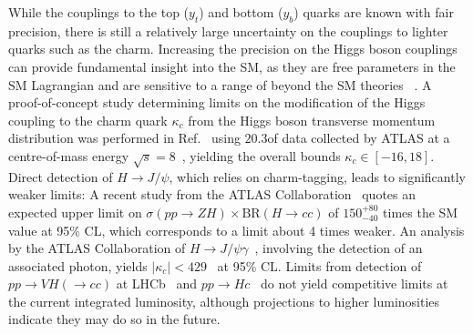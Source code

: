While the couplings to the top ($y_t$) and bottom ($y_b$) quarks are known with fair precision, there is still a relatively large uncertainty on the couplings to lighter quarks such as the charm.
% 
Increasing the precision on the Higgs boson couplings can provide fundamental insight into the SM, as they are free parameters in the SM Lagrangian and are sensitive to a range of beyond the SM theories
~\cite{Dimopoulos:1981zb,Witten:1981nf}.
% 
A proof-of-concept study determining limits on the modification of the Higgs coupling to the charm quark $\kappa_c$ from the Higgs boson transverse momentum distribution was performed in Ref.~\cite{Bishara:2016jga}
using $20.3$\ifb of data collected by ATLAS at a centre-of-mass energy $\sqrt{s}=8$~\cite{Aad:2015lha},
yielding the overall bounds $\kappa_c \in [ -16, 18 ]$.
% 
Direct detection of $H \rightarrow J/\psi$, which relies on charm-tagging, leads to significantly weaker limits: A recent study from the ATLAS Collaboration~\cite{Aaboud:2018fhh} quotes an expected upper limit on $\sigma(pp\rightarrow ZH) \times \text{BR}(H\rightarrow cc)$ of $150^{+80}_{-40}$ times the SM value at 95\% CL, which corresponds to a limit about 4 times weaker.
% 
An analysis by the ATLAS Collaboration of $H \rightarrow J/\psi\gamma$~\cite{Aad:2015sda}, involving the detection of an associated photon, yields $\left|\kappa_c\right|<429$~\cite{Koenig:2015pha} at 95\% CL.
% 
Limits from detection of $pp \rightarrow VH(\rightarrow cc)$ at LHCb~\cite{LHCb:2016yxg} and $pp \rightarrow Hc$~\cite{Brivio:2015fxa} do not yield competitive limits at the current integrated luminosity, although projections to higher luminosities indicate they may do so in the future.
% 
% 


